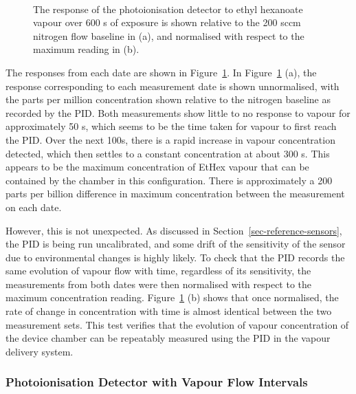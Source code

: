 \documentclass[
  a4paper,
]{scrbook}
\begin{document}
\begin{figure}
\begin{minipage}[t]{0.70\linewidth}
{{}

}

\end{minipage}%
%
\begin{minipage}[t]{0.15\linewidth}

{\centering 

~

}

\end{minipage}%

\caption{\label{fig-PID-EtHex-response}The response of the
photoionisation detector to ethyl hexanoate vapour over 600 s of
exposure is shown relative to the 200 sccm nitrogen flow baseline in
(a), and normalised with respect to the maximum reading in (b).}

\end{figure}

The responses from each date are shown in
Figure~\ref{fig-PID-EtHex-response}. In
Figure~\ref{fig-PID-EtHex-response} (a), the response corresponding to
each measurement date is shown unnormalised, with the parts per million
concentration shown relative to the nitrogen baseline as recorded by the
PID. Both measurements show little to no response to vapour for
approximately 50 s, which seems to be the time taken for vapour to first
reach the PID. Over the next 100s, there is a rapid increase in vapour
concentration detected, which then settles to a constant concentration
at about 300 s. This appears to be the maximum concentration of EtHex
vapour that can be contained by the chamber in this configuration. There
is approximately a 200 parts per billion difference in maximum
concentration between the measurement on each date.

However, this is not unexpected. As discussed in
Section~\ref{sec-reference-sensors}, the PID is being run uncalibrated,
and some drift of the sensitivity of the sensor due to environmental
changes is highly likely. To check that the PID records the same
evolution of vapour flow with time, regardless of its sensitivity, the
measurements from both dates were then normalised with respect to the
maximum concentration reading. Figure~\ref{fig-PID-EtHex-response} (b)
shows that once normalised, the rate of change in concentration with
time is almost identical between the two measurement sets. This test
verifies that the evolution of vapour concentration of the device
chamber can be repeatably measured using the PID in the vapour delivery
system.

\hypertarget{photoionisation-detector-with-vapour-flow-intervals}{%
\subsubsection*{Photoionisation Detector with Vapour Flow
Intervals}\label{photoionisation-detector-with-vapour-flow-intervals}}
\end{document}

